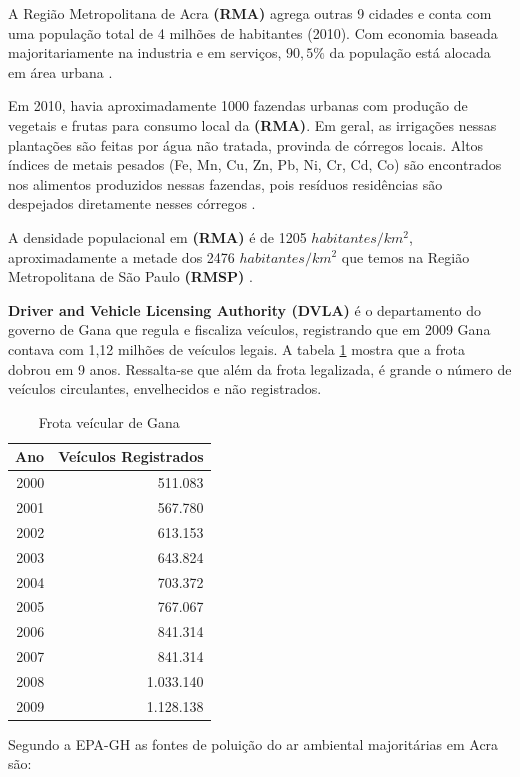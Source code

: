 A Região Metropolitana de Acra \textbf{(RMA)} agrega outras 9 cidades e conta com uma população total de 4 milhões de habitantes (2010). 
Com economia baseada majoritariamente na industria e em serviços, 
$90,5\%$ da população está alocada em área urbana \citep{ghanacensus2013}.

Em 2010, havia aproximadamente 1000 fazendas urbanas com produção de vegetais e
frutas para consumo local da \textbf{(RMA)}. Em geral, as irrigações nessas plantações
são feitas por água não tratada, provinda de córregos locais. 
Altos índices de metais pesados (Fe, Mn, Cu, Zn, Pb, Ni, Cr, Cd, Co)
são encontrados nos alimentos produzidos nessas fazendas, pois resíduos
residências são despejados diretamente nesses córregos \citep{lente2014}.

A densidade populacional em \textbf{(RMA)} é de 1205 $habitantes/km^2$, 
aproximadamente a metade dos 2476 $habitantes/km^2$ que temos na Região Metropolitana de São Paulo \textbf{(RMSP)} 
 \citep{ibge2011}. 

\textbf{Driver and Vehicle Licensing Authority (DVLA)} é o
departamento do governo de Gana que regula e fiscaliza veículos, registrando que em 2009 Gana contava com 1,12 milhões de veículos legais. 
A tabela \ref{table:dvla} mostra que a frota dobrou em 9 anos.
Ressalta-se que além da frota legalizada, é grande o número de veículos circulantes, envelhecidos e não registrados. 

\begin{table}[H]
 \centering
  \begin{tabular}{rr}
  \hline
  Ano & Veículos Registrados \\ 
  \hline
  2000 & 511.083 \\ 
  2001 & 567.780 \\ 
  2002 & 613.153 \\ 
  2003 & 643.824 \\ 
  2004 & 703.372 \\ 
  2005 & 767.067 \\ 
  2006 & 841.314 \\ 
  2007 & 841.314 \\ 
  2008 & 1.033.140 \\ 
  2009 & 1.128.138 \\ 
  \hline
  \end{tabular}
  \caption{Frota veícular de Gana \citep{dvla} \label{table:dvla}}
\end{table}
%
Segundo a EPA-GH \citep{epa2015} as fontes de poluição do ar ambiental 
majoritárias em Acra são:

